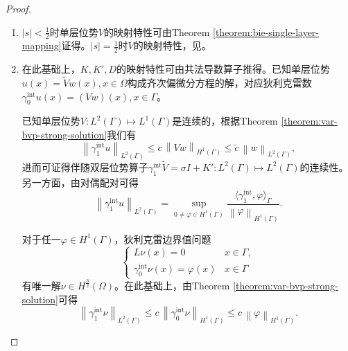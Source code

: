 \begin{proof}
  \begin{enumerate}
    \item $\left| s \right| < \frac{1}{2}$时单层位势$V$的映射特性可由Theorem \ref{theorem:bie-single-layer-mapping}证得。$\left| s \right| = \frac{1}{2}$时$V$的映射特性，见\cite{Verchota:1984fp, McLean:2000ta}。

    \item 在此基础上，$K,K',D$的映射特性可由共法导数算子推得。已知单层位势$u(x) = \widetilde{V} w (x), x \in \Omega$构成齐次偏微分方程的解，对应狄利克雷数$\gamma_{0}^{\text{int}} u(x) = \left( V w \right)(x), x \in \Gamma$。

    已知单层位势$V:L^{2}(\Gamma) \mapsto L^{1}(\Gamma)$是连续的，根据Theorem \ref{theorem:var-bvp-strong-solution}我们有
    \begin{equation*}
      \left\| \gamma_{1}^{\text{int}} u \right\|_{L^{2}(\Gamma)}
      \le c \, \left\| V w \right\|_{H^{1}(\Gamma)}
      \le \widetilde{c} \, \left\| w \right\|_{L^{2}(\Gamma)},
    \end{equation*}
    进而可证得伴随双层位势算子$\gamma_{1}^{\text{int}} \widetilde{V} = \sigma I + K':L^{2}(\Gamma) \mapsto L^{2}(\Gamma)$的连续性。另一方面，由对偶配对可得
    \begin{equation*}
      \left\| \gamma_{1}^{\text{int}} u \right\|_{L^{2}(\Gamma)}
      = \sup_{0 \neq \varphi \in H^{1}(\Gamma)}
      \frac{
      \langle \gamma_{1}^{\text{int}}, \varphi \rangle_{\Gamma}
      }{
      \left\| \varphi \right\|_{H^{1}(\Gamma)}
      }.
    \end{equation*}

  对于任一$\varphi \in H^{1}(\Gamma)$，狄利克雷边界值问题
  \begin{equation*}
    \begin{cases}
      L \nu (x) = 0 & x \in \Gamma,\\
      \gamma_{0}^{\text{int}} \nu(x) = \varphi(x) & x \in \Gamma
    \end{cases}
  \end{equation*}
  有唯一解$\nu \in H^{\frac{3}{2}}(\Omega)$。在此基础上，由Theorem \ref{theorem:var-bvp-strong-solution}可得
  \begin{equation*}
    \left\| \gamma_{1}^{\text{int}} \nu \right\|_{L^{2}(\Gamma)}
    \le c \, \left\| \gamma_{0}^{\text{int}} \nu \right\|_{H^{1}(\Gamma)}
    \le c \, \left\| \varphi \right\|_{H^{1}(\Gamma)}.
  \end{equation*}


\end{enumerate}
\end{proof}

